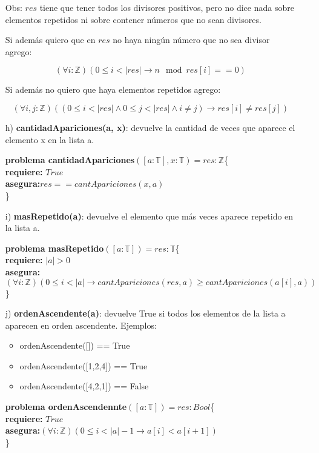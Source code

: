\documentclass[10pt,a4paper]{article}
\begin{document}
\begin{enumerate}
	Obs: $res$ tiene que tener todos los divisores positivos, pero no dice nada sobre elementos repetidos ni sobre contener números que no sean divisores.

Si además quiero que en $res$ no haya ningún número que no sea divisor agrego:

$$(\forall i: \mathbb{Z})(0\leq i < |res|\rightarrow n \mod res[i]==0)$$

Si además no quiero que haya elementos repetidos agrego:

$$(\forall i,j:\mathbb{Z})((0 \leq i <|res| \wedge 0\leq j<|res| \wedge i\not = j)\rightarrow res[i]\not = res[j])$$

	
\item[h)]\textbf{cantidadApariciones(a, x)}: devuelve la cantidad de veces que aparece el elemento x en la lista a.

\textbf{problema cantidadApariciones}$([a : \mathbb{T}],x:\mathbb{T})=res:\mathbb{Z}$\{ \\
	\textbf{  requiere:} $True$\\
	\textbf{asegura:}$res==cantApariciones(x,a)$\\
	\}
	
\item[i)]\textbf{masRepetido(a)}: devuelve el elemento que más veces aparece repetido en la lista a.

\textbf{problema masRepetido}$([a : \mathbb{T}])=res:\mathbb{T}$\{ \\
	\textbf{  requiere:} $|a|>0$\\
	\textbf{asegura:}$(\forall i:\mathbb{Z})(0\leq i<|a|\rightarrow cantApariciones(res,a)\geq cantApariciones(a[i],a))$\\
	\}
\item[j)]\textbf{ordenAscendente(a)}: devuelve True si todos los elementos de la lista a aparecen en orden ascendente. Ejemplos:
	\begin{itemize}
	\item ordenAscendente([]) == True
	\item ordenAscendente([1,2,4]) == True
	\item ordenAscendente([4,2,1]) == False
	\end{itemize}
	
	\textbf{problema ordenAscendennte}$([a : \mathbb{T}])=res:Bool$\{ \\
	\textbf{  requiere:} $True$\\
	\textbf{asegura:}$(\forall i:\mathbb{Z})(0\leq i<|a|-1\rightarrow a[i]<a[i+1])$\\
	\}
	

\end{enumerate}
\end{document}
